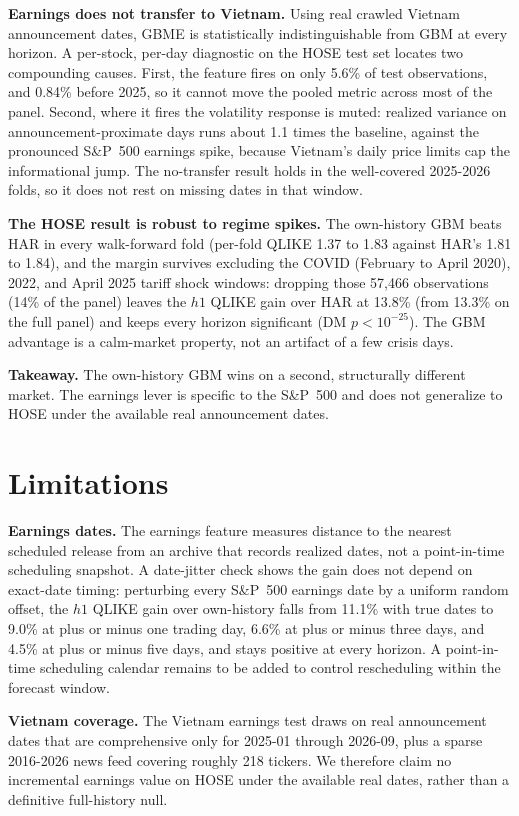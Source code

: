 \documentclass{llncs}
\begin{document}
\textbf{Earnings does not transfer to Vietnam.} Using real crawled Vietnam announcement dates, GBME is
statistically indistinguishable from GBM at every horizon. A per-stock, per-day diagnostic on the HOSE test set
locates two compounding causes. First, the feature fires on only 5.6\% of test observations, and
0.84\% before 2025, so it cannot move the pooled metric across most of the panel. Second, where it
fires the volatility response is muted: realized variance on announcement-proximate days runs about
1.1 times the baseline, against the pronounced S\&P~500 earnings spike, because Vietnam's daily price
limits cap the informational jump. The no-transfer result holds in the well-covered 2025-2026 folds,
so it does not rest on missing dates in that window.

\textbf{The HOSE result is robust to regime spikes.} The own-history GBM beats HAR in every
walk-forward fold (per-fold QLIKE 1.37 to 1.83 against HAR's 1.81 to 1.84), and the margin survives
excluding the COVID (February to April 2020), 2022, and April 2025 tariff shock windows: dropping
those 57{,}466 observations (14\% of the panel) leaves the $h1$ QLIKE gain over HAR at 13.8\% (from
13.3\% on the full panel) and keeps every horizon significant (DM $p<10^{-25}$). The GBM advantage is
a calm-market property, not an artifact of a few crisis days.

\textbf{Takeaway.} The own-history GBM wins on a second, structurally different market. The earnings
lever is specific to the S\&P~500 and does not generalize to HOSE under the available real
announcement dates.

\section{Limitations}
\noindent\textbf{Earnings dates.} The earnings feature measures distance to the nearest scheduled
release from an archive that records realized dates, not a point-in-time scheduling snapshot. A
date-jitter check shows the gain does not depend on exact-date timing: perturbing every S\&P~500
earnings date by a uniform random offset, the $h1$ QLIKE gain over own-history falls from 11.1\% with
true dates to 9.0\% at plus or minus one trading day, 6.6\% at plus or minus three days, and 4.5\% at
plus or minus five days, and stays positive at every horizon. A point-in-time scheduling calendar
remains to be added to control rescheduling within the forecast window.

\noindent\textbf{Vietnam coverage.} The Vietnam earnings test draws on real announcement dates that
are comprehensive only for 2025-01 through 2026-09, plus a sparse 2016-2026 news feed covering roughly
218 tickers. We therefore claim no incremental earnings value on HOSE under the available real dates,
rather than a definitive full-history null.
\end{document}
